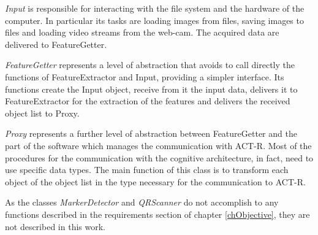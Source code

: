 	\emph{Input} is responsible for interacting with the file system and the hardware of the computer. In particular its tasks are loading images from files, saving images to files and loading video streams from the web-cam. The acquired data are delivered to FeatureGetter. 

	\emph{FeatureGetter} represents a level of abstraction that avoids to call directly the functions of FeatureExtractor and Input, providing a simpler interface. Its functions create the Input object, receive from it the input data, delivers it to FeatureExtractor for the extraction of the features and delivers the received object list to Proxy.

	\emph{Proxy} represents a further level of abstraction between FeatureGetter and the part of the software which manages the communication with ACT-R. Most of the procedures for the communication with the cognitive architecture, in fact, need to use specific data types. The main function of this class is to transform each object of the object list in the type necessary for the communication to ACT-R.

	As the classes \emph{MarkerDetector} and \emph{QRScanner} do not accomplish to any functions described in the requirements section of chapter \ref{chObjective}, they are not described in this work.

